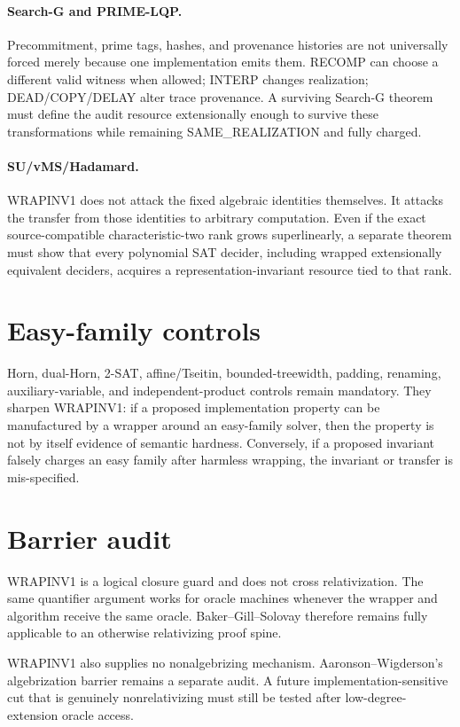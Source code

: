 \documentclass[11pt]{article}
\begin{document}
\paragraph{Search-G and PRIME-LQP.}
Precommitment, prime tags, hashes, and provenance histories are not universally forced merely because one implementation emits them. RECOMP can choose a different valid witness when allowed; INTERP changes realization; DEAD/COPY/DELAY alter trace provenance. A surviving Search-G theorem must define the audit resource extensionally enough to survive these transformations while remaining SAME\_REALIZATION and fully charged.

\paragraph{SU/vMS/Hadamard.}
WRAPINV1 does not attack the fixed algebraic identities themselves. It attacks the transfer from those identities to arbitrary computation. Even if the exact source-compatible characteristic-two rank grows superlinearly, a separate theorem must show that every polynomial SAT decider, including wrapped extensionally equivalent deciders, acquires a representation-invariant resource tied to that rank.

\section*{Easy-family controls}
Horn, dual-Horn, 2-SAT, affine/Tseitin, bounded-treewidth, padding, renaming, auxiliary-variable, and independent-product controls remain mandatory. They sharpen WRAPINV1: if a proposed implementation property can be manufactured by a wrapper around an easy-family solver, then the property is not by itself evidence of semantic hardness. Conversely, if a proposed invariant falsely charges an easy family after harmless wrapping, the invariant or transfer is mis-specified.

\section*{Barrier audit}
WRAPINV1 is a logical closure guard and does not cross relativization. The same quantifier argument works for oracle machines whenever the wrapper and algorithm receive the same oracle. Baker--Gill--Solovay therefore remains fully applicable to an otherwise relativizing proof spine.

WRAPINV1 also supplies no nonalgebrizing mechanism. Aaronson--Wigderson's algebrization barrier remains a separate audit. A future implementation-sensitive cut that is genuinely nonrelativizing must still be tested after low-degree-extension oracle access.
\end{document}
